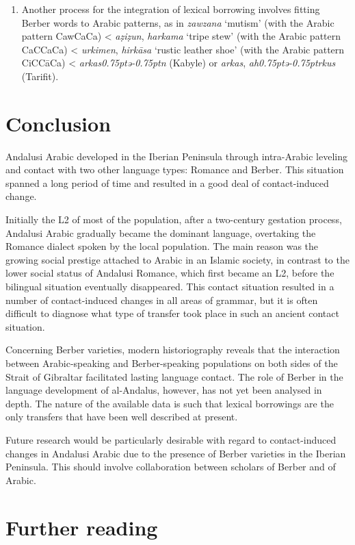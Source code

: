\documentclass[output=paper,modfonts,nonflat]{langsci/langscibook}
\begin{document}
\begin{enumerate}
\item Another process for the integration of lexical borrowing involves fitting Berber words to Arabic patterns, as in \textit{zawzana} ‘mutism’ (with the Arabic pattern CawCaCa) < \textit{aẓiẓun}, \textit{harkama} ‘tripe stew’ (with the Arabic pattern CaCCaCa) < \textit{urkimen}, \textit{hirkāsa} ‘rustic leather shoe’ (with the Arabic pattern CiCCāCa) < \textit{arkas\kern 0.75ptǝ\kern -0.75ptn} (Kabyle) or \textit{arkas}, \textit{ah\kern 0.75ptǝ\kern -0.75ptrkus} (Tarifit).
\end{enumerate}


\section{Conclusion}


Andalusi Arabic developed in the Iberian Peninsula through intra-Arabic leveling and contact with two other language types: Romance and Berber. This situation spanned a long period of time and resulted in a good deal of contact-induced change. 

Initially the L2 of most of the population, after a two-century gestation process, Andalusi Arabic gradually became the dominant language, overtaking the Romance dialect spoken by the local population. The main reason was the growing social prestige attached to Arabic in an Islamic society, in contrast to the lower social status of Andalusi Romance, which first became an L2, before the bilingual situation eventually disappeared. This contact situation resulted in a number of contact-induced changes in all areas of grammar, but it is often difficult to diagnose what type of transfer took place in such an ancient contact situation. 

Concerning Berber varieties, modern historiography reveals that the interaction between Arabic-speaking and Berber-speaking populations on both sides of the Strait of Gibraltar facilitated lasting language contact. The role of Berber in the language development of al-Andalus, however, has not yet been analysed in depth. The nature of the available data is such that lexical borrowings are the only transfers that have been well described at present. 

Future research would be particularly desirable with regard to contact-induced changes in Andalusi Arabic due to the presence of Berber varieties in the Iberian Peninsula. This should involve collaboration between scholars of Berber and of Arabic. 

\section*{Further reading}
\end{document}
